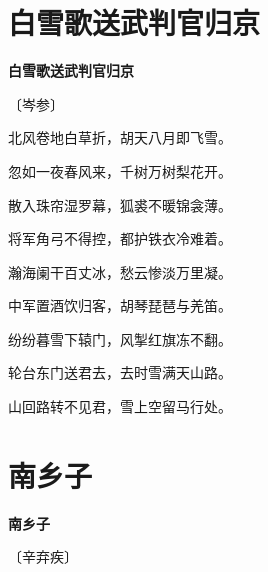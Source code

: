 \documentclass[12pt,UTF-8,openany,fontset=none]{ctexbook}
\begin{document}
\section{白雪歌送武判官归京}


\begin{center}
    {\bfseries 白雪歌送武判官归京}

    \vspace{18pt}

    \begin{large}\xuwen
        〔岑参〕
    \end{large}

\end{center}

    \vspace{18pt}  %

\begin{center}
    \begin{Large}

        北风卷地白草折，胡天八月即飞雪。

        忽如一夜春风来，千树万树梨花开。

        散入珠帘湿罗幕，狐裘不暖锦衾薄。

        将军角弓不得控，都护铁衣冷难着。

        瀚海阑干百丈冰，愁云惨淡万里凝。

        中军置酒饮归客，胡琴琵琶与羌笛。

        纷纷暮雪下辕门，风掣红旗冻不翻。

        轮台东门送君去，去时雪满天山路。

        山回路转不见君，雪上空留马行处。

    \end{Large}

\end{center}

\vspace{8pt}
\clearpage

\section{南乡子}


\begin{center}
    {\bfseries 南乡子}

    \vspace{18pt}

    \begin{large}\xuwen
        〔辛弃疾〕
    \end{large}

\end{center}
\end{document}
